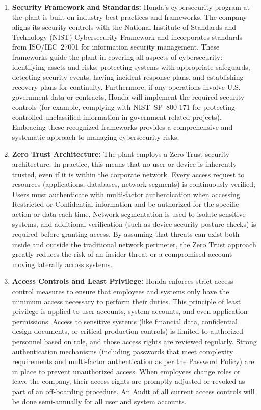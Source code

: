 \begin{enumerate}
    \item \textbf{Security Framework and Standards:} Honda’s cybersecurity program at the plant is built on industry best practices and frameworks. The company aligns its security controls with the National Institute of Standards and Technology (NIST) Cybersecurity Framework and incorporates standards from ISO/IEC~27001 for information security management. These frameworks guide the plant in covering all aspects of cybersecurity: identifying assets and risks, protecting systems with appropriate safeguards, detecting security events, having incident response plans, and establishing recovery plans for continuity. Furthermore, if any operations involve U.S. government data or contracts, Honda will implement the required security controls (for example, complying with NIST~SP~800-171 for protecting controlled unclassified information in government-related projects). Embracing these recognized frameworks provides a comprehensive and systematic approach to managing cybersecurity risks.
    \item \textbf{Zero Trust Architecture:} The plant employs a Zero Trust security architecture. In practice, this means that no user or device is inherently trusted, even if it is within the corporate network. Every access request to resources (applications, databases, network segments) is continuously verified; Users must authenticate with multi-factor authentication when accessing Restricted or Confidential information and be authorized for the specific action or data each time. Network segmentation is used to isolate sensitive systems, and additional verification (such as device security posture checks) is required before granting access. By assuming that threats can exist both inside and outside the traditional network perimeter, the Zero Trust approach greatly reduces the risk of an insider threat or a compromised account moving laterally across systems.
    \item \textbf{Access Controls and Least Privilege:} Honda enforces strict access control measures to ensure that employees and systems only have the minimum access necessary to perform their duties. This principle of least privilege is applied to user accounts, system accounts, and even application permissions. Access to sensitive systems (like financial data, confidential design documents, or critical production controls) is limited to authorized personnel based on role, and those access rights are reviewed regularly. Strong authentication mechanisms (including passwords that meet complexity requirements and multi-factor authentication as per the Password Policy) are in place to prevent unauthorized access. When employees change roles or leave the company, their access rights are promptly adjusted or revoked as part of an off-boarding procedure. An Audit of all current access controls will be done semi-annually for all user and system accounts.

\end{enumerate}
